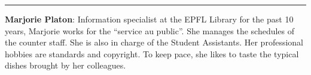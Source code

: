 \begin{center}\rule{0.5\linewidth}{0.5pt}\end{center}

\textbf{Marjorie Platon}: Information specialist at the EPFL Library for
the past 10 years, Marjorie works for the ``service au public''. She
manages the schedules of the counter staff. She is also in charge of the
Student Assistants. Her professional hobbies are standards and
copyright. To keep pace, she likes to taste the typical dishes brought
by her colleagues.
